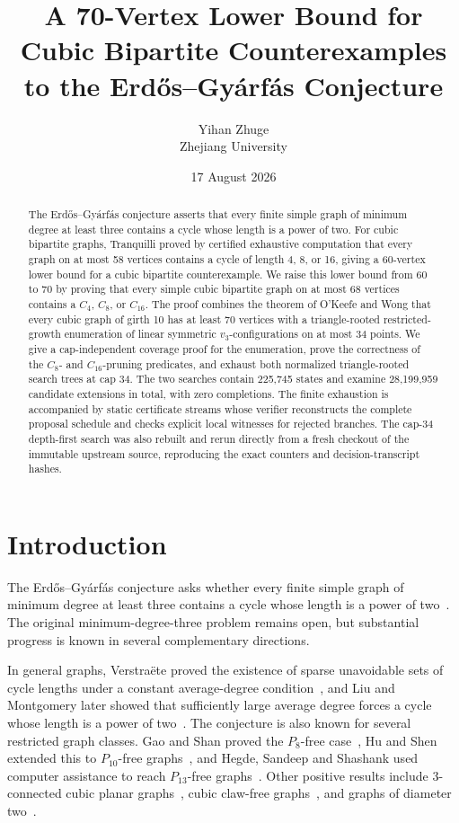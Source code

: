\documentclass[11pt]{article}
\title{A 70-Vertex Lower Bound for Cubic Bipartite Counterexamples\\
       to the Erd\H{o}s--Gy\'arf\'as Conjecture}
\author{Yihan Zhuge\\Zhejiang University}
\date{17 August 2026}
\theoremstyle{remark}
\newcommand{\Cfour}{C_4}
\newcommand{\Ceight}{C_8}
\newcommand{\Csixteen}{C_{16}}
\newcommand{\vthree}{v_3}
\begin{document}
\maketitle

\begin{abstract}
The Erd\H{o}s--Gy\'arf\'as conjecture asserts that every finite simple graph of minimum degree at least three contains a cycle whose length is a power of two.  For cubic bipartite graphs, Tranquilli proved by certified exhaustive computation that every graph on at most 58 vertices contains a cycle of length 4, 8, or 16, giving a 60-vertex lower bound for a cubic bipartite counterexample.  We raise this lower bound from 60 to 70 by proving that every simple cubic bipartite graph on at most 68 vertices contains a \(\Cfour\), \(\Ceight\), or \(\Csixteen\).  The proof combines the theorem of O'Keefe and Wong that every cubic graph of girth 10 has at least 70 vertices with a triangle-rooted restricted-growth enumeration of linear symmetric \(\vthree\)-configurations on at most 34 points.  We give a cap-independent coverage proof for the enumeration, prove the correctness of the \(\Ceight\)- and \(\Csixteen\)-pruning predicates, and exhaust both normalized triangle-rooted search trees at cap 34.  The two searches contain 225,745 states and examine 28,199,959 candidate extensions in total, with zero completions.  The finite exhaustion is accompanied by static certificate streams whose verifier reconstructs the complete proposal schedule and checks explicit local witnesses for rejected branches.  The cap-34 depth-first search was also rebuilt and rerun directly from a fresh checkout of the immutable upstream source, reproducing the exact counters and decision-transcript hashes.
\end{abstract}

\section{Introduction}

The Erd\H{o}s--Gy\'arf\'as conjecture asks whether every finite simple graph of minimum degree at least three contains a cycle whose length is a power of two~\cite{erdos1997}.  The original minimum-degree-three problem remains open, but substantial progress is known in several complementary directions.

In general graphs, Verstra\"ete proved the existence of sparse unavoidable sets of cycle lengths under a constant average-degree condition~\cite{verstraete2005}, and Liu and Montgomery later showed that sufficiently large average degree forces a cycle whose length is a power of two~\cite{liu2023}.  The conjecture is also known for several restricted graph classes.  Gao and Shan proved the \(P_8\)-free case~\cite{gao2022}, Hu and Shen extended this to \(P_{10}\)-free graphs~\cite{hu2024}, and Hegde, Sandeep and Shashank used computer assistance to reach \(P_{13}\)-free graphs~\cite{hegde2024}.  Other positive results include 3-connected cubic planar graphs~\cite{heckman2013}, cubic claw-free graphs~\cite{nowbandegani2014}, and graphs of diameter two~\cite{carr2025}.
\end{document}
